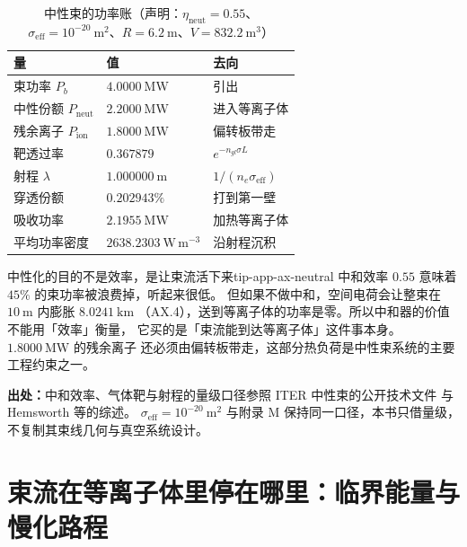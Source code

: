 \begin{table}[htbp]
\centering
\small
\caption{中性束的功率账（声明：$\eta_\mathrm{neut}=0.55$、$\sigma_\mathrm{eff}=10^{-20}\ \mathrm{m^2}$、$R=6.2\ \mathrm{m}$、$V=832.2\ \mathrm{m^3}$）}
\label{tab:app-ax-neutral}
\begin{tabular}{p{5.0cm}p{4.4cm}p{4.0cm}}
\hline
量 & 值 & 去向 \\
\hline
束功率 $P_b$ & $4.0000\ \mathrm{MW}$ & 引出 \\
中性份额 $P_\mathrm{neut}$ & $2.2000\ \mathrm{MW}$ & 进入等离子体 \\
残余离子 $P_\mathrm{ion}$ & $1.8000\ \mathrm{MW}$ & 偏转板带走 \\
靶透过率 & $0.367879$ & $e^{-n_{gl}\sigma L}$ \\
射程 $\lambda$ & $1.000000\ \mathrm{m}$ & $1/(n_e\sigma_\mathrm{eff})$ \\
穿透份额 & $0.202943\%$ & 打到第一壁 \\
吸收功率 & $2.1955\ \mathrm{MW}$ & 加热等离子体 \\
平均功率密度 & $2638.2303\ \mathrm{W\,m^{-3}}$ & 沿射程沉积 \\
\hline
\end{tabular}
\end{table}

\begin{tip}{中性化的目的不是效率，是让束流活下来}{tip-app-ax-neutral}
中和效率 $0.55$ 意味着 $45\%$ 的束功率被浪费掉，听起来很低。
但如果不做中和，空间电荷会让整束在 $10\ \mathrm{m}$ 内膨胀 $8.0241\ \mathrm{km}$
（AX.4），送到等离子体的功率是零。所以中和器的价值不能用「效率」衡量，
它买的是「束流能到达等离子体」这件事本身。$1.8000\ \mathrm{MW}$ 的残余离子
还必须由偏转板带走，这部分热负荷是中性束系统的主要工程约束之一。
\end{tip}

{\footnotesize
\textbf{出处：}中和效率、气体靶与射程的量级口径参照 ITER 中性束的公开技术文件
与 Hemsworth 等的综述。
$\sigma_\mathrm{eff}=10^{-20}\ \mathrm{m^2}$ 与附录 M
保持同一口径，本书只借量级，不复制其束线几何与真空系统设计。
}

\section{束流在等离子体里停在哪里：临界能量与慢化路程}
\label{sec:app-ax-slowing}

